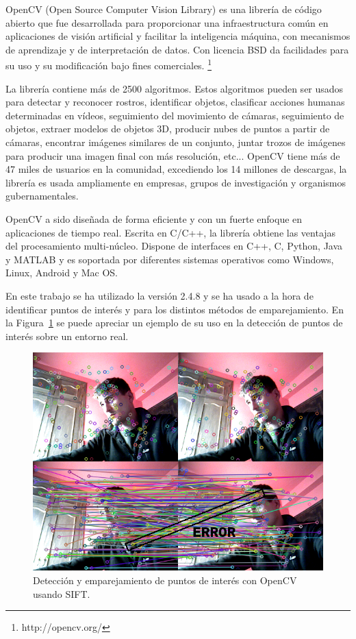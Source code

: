 OpenCV (Open Source Computer Vision Library) es una librería de código abierto que fue desarrollada para proporcionar una infraestructura común en aplicaciones de visión artificial y facilitar la inteligencia máquina, con mecanismos de aprendizaje y de interpretación de datos. Con licencia BSD da facilidades para su uso y su modificación bajo fines comerciales. \footnote{http://opencv.org/}

La librería contiene más de 2500 algoritmos. Estos algoritmos pueden ser usados para detectar y reconocer rostros, identificar objetos, clasificar acciones humanas determinadas en vídeos, seguimiento del movimiento de cámaras, seguimiento de objetos, extraer modelos de objetos 3D, producir nubes de puntos a partir de cámaras, encontrar imágenes similares de un conjunto, juntar trozos de imágenes para producir una imagen final con más resolución, etc... OpenCV tiene más de 47 miles de usuarios en la comunidad, excediendo los 14 millones de descargas, la librería es usada ampliamente en empresas, grupos de investigación y organismos gubernamentales.

OpenCV a sido diseñada de forma eficiente y con un fuerte enfoque en aplicaciones de tiempo real. Escrita en C/C++, la librería obtiene las ventajas del procesamiento multi-núcleo. Dispone de interfaces en C++, C, Python, Java y MATLAB y es soportada por diferentes sistemas operativos como Windows, Linux, Android y Mac OS.

En este trabajo se ha utilizado la versión 2.4.8 y se ha usado a la hora de identificar puntos de interés y para los distintos métodos de emparejamiento. En la Figura~\ref{fig:SiftDetector} se puede apreciar un ejemplo de su uso en la detección de puntos de interés sobre un entorno real.

\begin{figure}[th]
\centering
\includegraphics[scale=0.8]{Figures/sift-detector.png}
\decoRule
\caption[sift-detector]{Detección y emparejamiento de puntos de interés con OpenCV usando SIFT.}
\label{fig:SiftDetector}
\end{figure}


